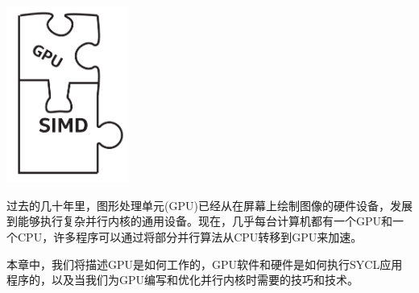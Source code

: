 \begin{center}
	\includegraphics[width=0.3\textwidth]{content/chapter-15/images/1}
\end{center}

过去的几十年里，图形处理单元(GPU)已经从在屏幕上绘制图像的硬件设备，发展到能够执行复杂并行内核的通用设备。现在，几乎每台计算机都有一个GPU和一个CPU，许多程序可以通过将部分并行算法从CPU转移到GPU来加速。\par

本章中，我们将描述GPU是如何工作的，GPU软件和硬件是如何执行SYCL应用程序的，以及当我们为GPU编写和优化并行内核时需要的技巧和技术。\par
























































